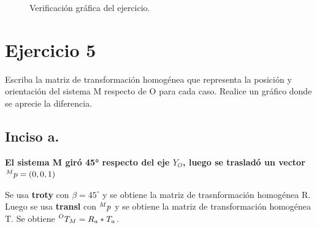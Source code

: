 \documentclass[a4paper,12pt]{article}
\begin{document}
\begin{figure}[H]
    \centering
    \begin{adjustbox}{scale = 0.85, max width=\columnwidth}
    \end{adjustbox}
    \caption{Verificación gráfica del ejercicio.}
\end{figure}

\section{Ejercicio 5}
Escriba la matriz de transformación homogénea que representa la posición y
orientación del sistema {M} respecto de {O} para cada caso. Realice un gráfico donde se
aprecie la diferencia.

\subsection{Inciso a.}
\textbf{El sistema {M} giró 45° respecto del eje $Y_O$, luego se trasladó un vector $\prescript{M}{}{p} = (0, 0, 1)$}
\vspace{0.5 cm}

Se usa \textbf{troty} con $\beta = 45^\circ$ y se obtiene la matriz de trasnformación homogénea R.
Luego se usa \textbf{transl} con $\prescript{M}{}{p}$ y se obtiene la matriz de transformación homogénea T.
Se obtiene $\prescript{O}{}{T_M} = R_a*T_a$.
\end{document}
